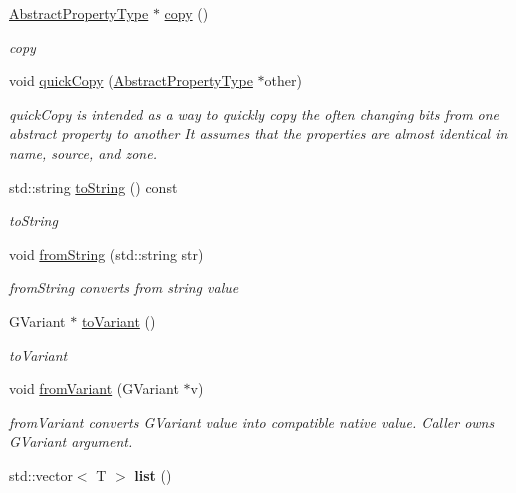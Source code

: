 \begin{DoxyCompactItemize}
\item 
\hyperlink{classAbstractPropertyType}{Abstract\+Property\+Type} $\ast$ \hyperlink{classListPropertyType_a2b4d928c8fa6c7317a31d4aa376908d1}{copy} ()
\begin{DoxyCompactList}\small\item\em copy \end{DoxyCompactList}\item 
void \hyperlink{classListPropertyType_a1e5afbe102ea305d8095ee6e56a08753}{quick\+Copy} (\hyperlink{classAbstractPropertyType}{Abstract\+Property\+Type} $\ast$other)
\begin{DoxyCompactList}\small\item\em quick\+Copy is intended as a way to quickly copy the often changing bits from one abstract property to another It assumes that the properties are almost identical in name, source, and zone. \end{DoxyCompactList}\item 
std\+::string \hyperlink{classListPropertyType_a7c0f0a4ab1d1ceaf4d7abfbdade7f5ea}{to\+String} () const 
\begin{DoxyCompactList}\small\item\em to\+String \end{DoxyCompactList}\item 
\hypertarget{classListPropertyType_aa49d1bc6968d7201b4d836b5049133f0}{void \hyperlink{classListPropertyType_aa49d1bc6968d7201b4d836b5049133f0}{from\+String} (std\+::string str)}\label{classListPropertyType_aa49d1bc6968d7201b4d836b5049133f0}

\begin{DoxyCompactList}\small\item\em from\+String converts from string value \end{DoxyCompactList}\item 
G\+Variant $\ast$ \hyperlink{classListPropertyType_ab0a0e192757158cd9901becacbafdb41}{to\+Variant} ()
\begin{DoxyCompactList}\small\item\em to\+Variant \end{DoxyCompactList}\item 
void \hyperlink{classListPropertyType_aa76b2385816ce8a12982109d632b6b93}{from\+Variant} (G\+Variant $\ast$v)
\begin{DoxyCompactList}\small\item\em from\+Variant converts G\+Variant value into compatible native value. Caller owns G\+Variant argument. \end{DoxyCompactList}\item 
\hypertarget{classListPropertyType_aaf85b36efce3dbdfe8c60318ffda317b}{std\+::vector$<$ T $>$ {\bfseries list} ()}\label{classListPropertyType_aaf85b36efce3dbdfe8c60318ffda317b}

\end{DoxyCompactItemize}
